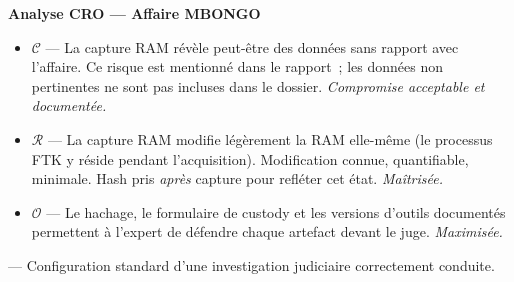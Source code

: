 \begin{boxCRO}
\textbf{Analyse CRO --- Affaire MBONGO}

\begin{itemize}
    \item $\mathcal{C}$ --- La capture RAM révèle peut-être des données sans
          rapport avec l'affaire. Ce risque est mentionné dans le rapport~;
          les données non pertinentes ne sont pas incluses dans le dossier.
          \hfill\textit{Compromise acceptable et documentée.}

    \item $\mathcal{R}$ --- La capture RAM modifie légèrement la RAM
          elle-même (le processus FTK y réside pendant l'acquisition).
          Modification connue, quantifiable, minimale. Hash pris
          \emph{après} capture pour refléter cet état.
          \hfill\textit{Maîtrisée.}

    \item $\mathcal{O}$ --- Le hachage, le formulaire de custody et les
          versions d'outils documentés permettent à l'expert de défendre
          chaque artefact devant le juge.
          \hfill\textit{Maximisée.}
\end{itemize}

 ---
Configuration standard d'une investigation judiciaire correctement conduite.
\end{boxCRO}

\separateur

